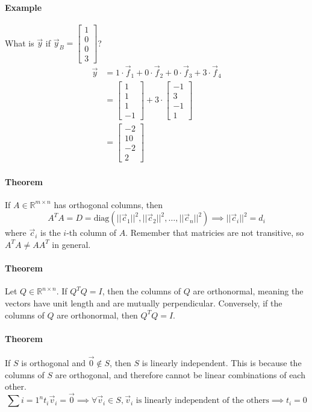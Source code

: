 \paragraph*{Example}
What is $\vec{y}$ if $\vec{y}_B = \begin{bmatrix}
    1 \\ 0 \\ 0 \\ 3
\end{bmatrix}$?
\begin{align*}
\vec{y} &= 1 \cdot \vec{f}_1 + 0 \cdot \vec{f}_2 + 0 \cdot \vec{f}_3 + 3 \cdot \vec{f}_4 \\
&= \begin{bmatrix}
    1 \\ 1 \\ 1 \\ -1
\end{bmatrix} + 3 \cdot \begin{bmatrix}
    -1 \\ 3 \\ -1 \\ 1
\end{bmatrix} \\
&= \begin{bmatrix}    
    -2 \\ 10 \\ -2 \\ 2
\end{bmatrix}
\end{align*}

\paragraph*{Theorem}
If $A \in \mathbb{R}^{m \times n}$ has orthogonal columns, then
\[A^T A = D = \text{diag}(||\vec{c}_1||^2, ||\vec{c}_2||^2, \ldots, ||\vec{c}_n||^2) \implies ||\vec{c}_i||^2 = d_i\]
where $\vec{c}_i$ is the $i$-th column of $A$. Remember that matricies are not transitive, so $A^T A \neq A A^T$ in general.

\paragraph*{Theorem}
Let $Q \in \mathbb{R}^{n \times n}$. If $Q^T Q = I$, then the columns of $Q$ are orthonormal, meaning the vectors have unit length and are mutually perpendicular. Conversely, if the columns of $Q$ are orthonormal, then $Q^T Q = I$.

\paragraph*{Theorem}
If $S$ is orthogonal and $\vec{0} \notin S$, then $S$ is linearly independent. This is because the columns of $S$ are orthogonal, and therefore cannot be linear combinations of each other.
\[\sum{i = 1}^n t_i \vec{v}_i = \vec{0} \implies \forall \vec{v}_i \in S, \vec{v}_i \text{ is linearly independent of the others} \implies t_i = 0\]